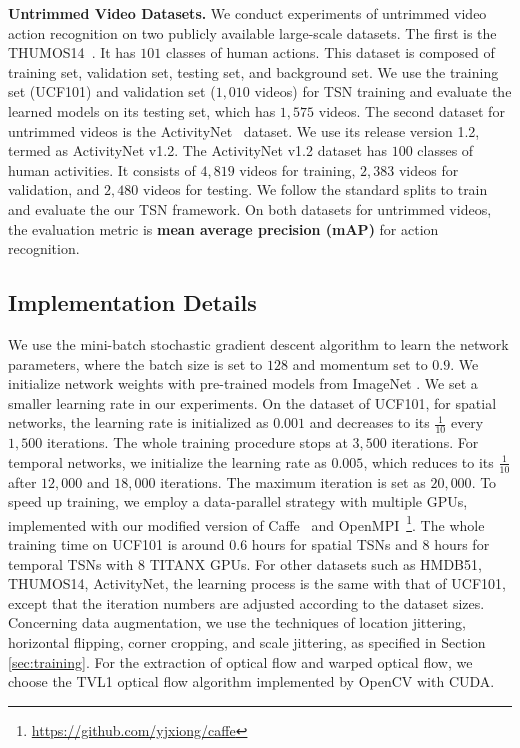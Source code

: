 \documentclass[10pt,journal,compsoc]{IEEEtran}
\begin{document}
\textbf{Untrimmed Video Datasets.} We conduct experiments of untrimmed video action recognition on two publicly available large-scale datasets. The first is the THUMOS14~\cite{Jiang2014THUMOS14}. It has $ 101 $ classes of human actions. This dataset is composed of training set, validation set, testing set, and background set. We use the training set (UCF101) and validation set ($ 1,010 $ videos) for TSN training and evaluate the learned models on its testing set, which has $ 1,575 $ videos.
The second dataset for untrimmed videos is the ActivityNet~\cite{HeilbronEGN15} dataset. We use its release version 1.2, termed as ActivityNet v1.2. The ActivityNet v1.2 dataset has $ 100 $ classes of human activities. It consists of $ 4,819 $ videos for training, $ 2,383 $ videos for validation, and $ 2,480 $ videos for testing. We follow the standard splits to train and evaluate the our TSN framework.
On both datasets for untrimmed videos, the evaluation metric is \textbf{mean average precision (mAP)} for action recognition.

\subsection{Implementation Details}

We use the mini-batch stochastic gradient descent algorithm to learn the network parameters, where the batch size is set to $ 128 $ and momentum set to $ 0.9 $. We initialize network weights with pre-trained models from ImageNet \cite{DengDSLL009}. We set a smaller learning rate in our experiments. On the dataset of UCF101, for spatial networks, the learning rate is initialized as $0.001$ and decreases to its $\frac{1}{10}$ every $ 1,500 $ iterations. The whole training procedure stops at $ 3,500 $ iterations. For temporal networks, we initialize the learning rate as $0.005$, which reduces to its $\frac{1}{10}$ after $ 12,000 $ and $18,000$ iterations. The maximum iteration is set as $20,000$. To speed up training, we employ a data-parallel strategy with multiple GPUs, implemented with our modified version of Caffe~\cite{JiaSDKLGGD14} and OpenMPI~\footnote{\url{https://github.com/yjxiong/caffe}}. The whole training time on UCF101 is around 0.6 hours for spatial TSNs and 8 hours for temporal TSNs with 8 TITANX GPUs. For other datasets such as HMDB51, THUMOS14, ActivityNet, the learning process is the same with that of UCF101, except that the iteration numbers are adjusted according to the dataset sizes. Concerning data augmentation, we use the techniques of location jittering, horizontal flipping, corner cropping, and scale jittering, as specified in Section \ref{sec:training}. For the extraction of optical flow and warped optical flow, we choose the TVL1 optical flow algorithm \cite{ZachPB07} implemented by OpenCV with CUDA.
\end{document}
